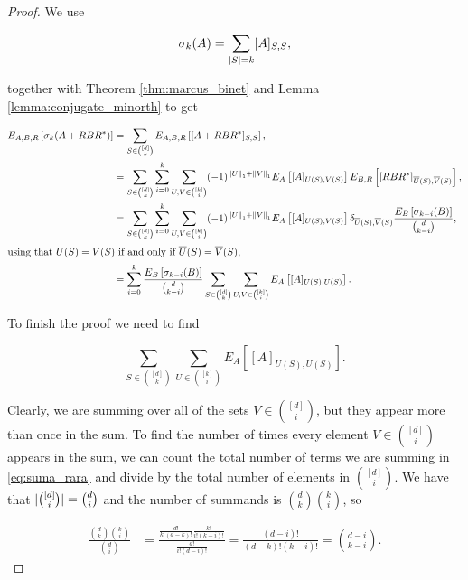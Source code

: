 \begin{proof}
    We use 

    \begin{equation*}
        \sigma_k(A) = \sum_{\lvert S \rvert=k} [A]_{S,S},
    \end{equation*}

    \noindent together with Theorem \ref{thm:marcus_binet} and Lemma \ref{lemma:conjugate_minorth} to get 

    \begin{align*}
        E_{A,B,R}\left[ \sigma_k(A + RBR^*) \right] &= \sum_{S \in \binom{[d]}{k}} E_{A,B,R} \left[ [A + RBR^*]_{S,S} \right],\\ 
        &= \sum_{S\in\binom{[d]}{k}} \sum_{i=0}^k \sum_{U,V\in \binom{[k]}{i}} (-1)^{\left\lVert U\right\rVert_1 + \left\lVert V\right\rVert_1} E_A\left[ [A]_{U(S),V(S)} \right] E_{B,R}\left[ [RBR^*]_{\overline{U}(S),\overline{V}(S)} \right],\\ 
        &= \sum_{S\in\binom{[d]}{k}} \sum_{i=0}^k \sum_{U,V\in \binom{[k]}{i}} (-1)^{\left\lVert U\right\rVert_1 + \left\lVert V\right\rVert_1} E_A\left[ [A]_{U(S),V(S)} \right] \delta_{\overline{U}(S),\overline{V}(S)} \frac{E_{B}\left[ \sigma_{k-i}(B)\right]}{\binom{d}{k-i}},\\ 
        \intertext{using that $U(S)=V(S)$ if and only if $\overline{U}(S) = \overline{V}(S)$,}
        &= \sum_{i=0}^k \frac{E_{B}\left[ \sigma_{k-i}(B)\right]}{\binom{d}{k-i}} \sum_{S\in\binom{[d]}{k}} \sum_{U,V\in \binom{[k]}{i}}  E_A\left[ [A]_{U(S),U(S)} \right].
    \end{align*}

    To finish the proof we need to find

    \begin{equation} \label{eq:suma_rara} \sum_{S\in\binom{[d]}{k}} \sum_{U\in \binom{[k]}{i}}  E_A\left[ [A]_{U(S),U(S)} \right]. \end{equation}

    Clearly, we are summing over all of the sets $V \in \binom{[d]}{i}$, but they appear more than once in the sum. To find the number of times every element $V\in \binom{[d]}{i}$ appears in the sum, we can count the total number of terms we are summing in \eqref{eq:suma_rara} and divide by the total number of elements in $\binom{[d]}{i}$. We have that $\lvert \binom{[d]}i \rvert = \binom{d}{i}$ and the number of summands is $\binom{d}{k}\binom{k}{i}$, so

    \begin{align*}
        \frac{\binom{d}{k}\binom{k}{i}}{\binom{d}{i}} &= \frac{\frac{d!}{k!(d-k)!}\frac{k!}{i!(k-i)!}}{\frac{d!}{i!(d-i)!}} = \frac{(d-i)!}{(d-k)!(k-i)!} = \binom{d-i}{k-i}.
    \end{align*}


\end{proof}
